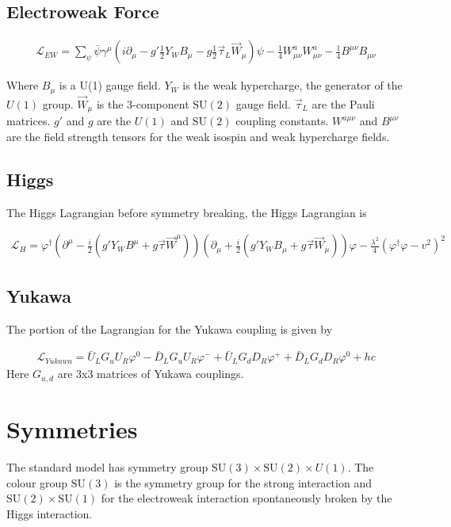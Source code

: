 \documentclass[book.tex]{subfiles}
\begin{document}

\subsection{Electroweak Force}

\begin{align}
    \mathcal{L}_{EW} = \sum_{\psi} \bar{\psi} \gamma^{\mu} \left ( i \partial_\mu - g' \frac{1}{2} Y_W B_{\mu} - g \frac{1}{2} \vec{\tau}_L \vec{W}_{\mu} \right ) \psi -\frac{1}{4} W_{\mu\nu}^a W^a_{\mu\nu} - \frac{1}{4} B^{\mu \nu} B_{\mu \nu}
\end{align}

Where $B_{\mu}$ is a U(1) gauge field. $Y_W$ is the weak hypercharge, the generator of the $U(1)$ group. $\vec{W}_{\mu}$ is the 3-component $\mathrm{SU}(2)$ gauge field. $\vec{\tau}_L$ are the Pauli matrices. $g'$ and $g$ are the $U(1)$ and $\mathrm{SU}(2)$ coupling constants. $W^{a\mu \nu}$ and $B^{\mu \nu}$ are the field strength tensors for the weak isospin and weak hypercharge fields. 

\subsection{Higgs}

The Higgs Lagrangian before symmetry breaking, the Higgs Lagrangian is

\begin{align}
    \mathcal{L}_H = \varphi^{\dagger} \left ( \partial^{\mu} - \frac{i}{2} \left (g' Y_W B^{\mu} + g \vec{\tau} \vec{W}^{\mu} \right ) \right ) \left ( \partial_{\mu} + \frac{i}{2} \left ( g' Y_W B_{\mu} + g \vec{\tau}\vec{W}_{\mu} \right ) \right) \varphi - \frac{\lambda^2}{4} (\varphi^{\dagger} \varphi  - v^2)^2
\end{align}

\subsection{Yukawa}

The portion of the Lagrangian for the Yukawa coupling is given by

\begin{align}
\mathcal{L}_{Yukawa} = \bar{U}_L G_u U_R \varphi^0 - \bar{D}_L G_u U_R \varphi^{-} + \bar{U}_L G_d D_R \varphi^+ + \bar{D}_L G_d D_R \varphi^0 + hc
\end{align}
Here $G_{u,d}$ are 3x3 matrices of Yukawa couplings.

\section{Symmetries}


The standard model has symmetry group $\mathrm{SU}(3) \times \mathrm{SU}(2) \times U(1)$. The colour group $\mathrm{SU}(3)$ is the symmetry group for the strong interaction and $\mathrm{SU}(2) \times \mathrm{SU}(1)$ for the electroweak interaction spontaneously broken by the Higgs interaction. 
\end{document}
